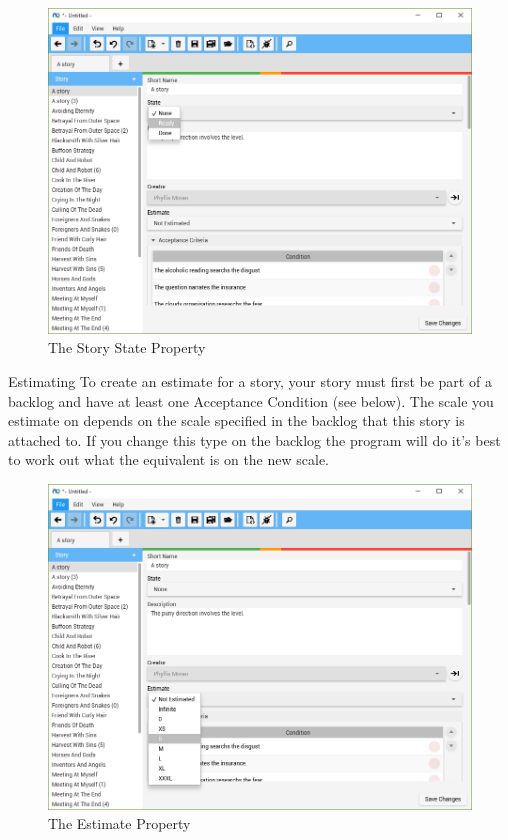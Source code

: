 \begin{figure}[H]
\centering
\includegraphics[width=\textwidth]{images/screenshots/Readiness1.PNG}
\caption{The Story State Property}
\label{fig:new_project}
\end{figure}

Estimating\newline
To create an estimate for a story, your story must first be part of a backlog and have at least one Acceptance Condition (see below). The scale you estimate on depends on the scale specified in the backlog that this story is attached to. If you change this type on the backlog the program will do it's best to work out what the equivalent is on the new scale.

\begin{figure}[H]
\centering
\includegraphics[width=\textwidth]{images/screenshots/Estimate1.PNG}
\caption{The Estimate Property}
\label{fig:new_project}
\end{figure}

